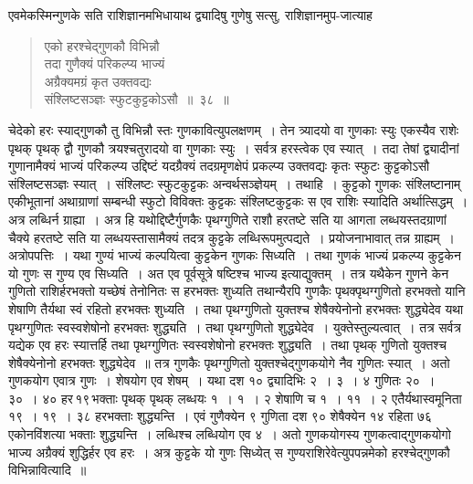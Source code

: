 \documentclass[11pt, openany]{book}
\begin{document}
\vspace{-3mm}
 एवमेकस्मिन्गुणके सति राशिज्ञानमभिधायाथ द्व्यादिषु गुणेषु सत्सु, 
राशिज्ञानमुप-जात्याह\textendash
\begin{quote}
    \bs
     एको हरश्चेद्गुणकौ विभिन्नौ \\

\vspace{-7mm}
\hspace{1cm} तदा गुणैक्यं परिकल्प्य भाज्यं \\

\vspace{-7mm}
 अग्रैक्यमग्रं कृत उक्तवद्यः \\

\vspace{-7mm}
\hspace{1cm} संश्लिष्टसञ्ज्ञः स्फुटकुट्टकोऽसौ~॥~३८~॥~
\end{quote}

 चेदेको हरः स्याद्गुणकौ तु विभिन्नौ स्तः गुणकावित्युपलक्षणम्~। तेन 
त्र्यादयो वा गुणकाः स्युः एकस्यैव राशेः पृथक् पृथक् द्वौ गुणकौ
त्रयश्चतुरादयो वा गुणकाः स्युः~। सर्वत्र हरस्त्वेक एव स्यात्~। तदा तेषां द्व्यादीनां
गुणानामैक्यं भाज्यं परिकल्प्य उद्दिष्टं यदग्रैक्यं तदग्रमृणक्षेपं प्रकल्प्य
उक्तवद्यः कृतः स्फुटः कुट्टकोऽसौ संश्लिष्टसञ्ज्ञः स्यात्~। संश्लिष्टः स्फुटकुट्टकः
अन्वर्थसञ्ज्ञेयम्~। तथाहि~। कुट्टको गुणकः संश्लिष्टानाम् एकीभूतानां अथाग्राणां सम्बन्धी स्फुटो विविक्तः कुट्टकः संश्लिष्टकुट्टकः स एव राशिः स्यादिति अर्थात्सिद्धम्~। अत्र लब्धिर्न ग्राह्या~। अत्र हि यथोद्दिष्टैर्गुणकैः पृथग्गुणिते राशौ हरतष्टे सति या आगता लब्धयस्तदग्राणां चैक्ये हरतष्टे सति या लब्धयस्तासामैक्यं तदत्र कुट्टके 
लब्धिरूपमुत्पद्यते~। प्रयोजनाभावात् तन्न ग्राह्यम्~।
\newpage%
 अत्रोपपत्तिः~। यथा गुण्यं भाज्यं कल्पयित्वा कुट्टकेन गुणकः 
सिध्यति~। तथा गुणकं भाज्यं प्रकल्प्य कुट्टकेन यो गुणः स गुण्य एव 
सिध्यति~। अत एव पूर्वसूत्रे षष्टिश्च भाज्य इत्याद्युक्तम्~। तत्र यथैकेन
गुणने केन गुणितो राशिर्हरभक्तो यच्छेषं तेनोनितः स हरभक्तः शुध्यति 
तथान्यैरपि गुणकैः पृथक्पृथग्गुणितो हरभक्तो यानि शेषाणि तैर्यथा स्वं रहितो 
हरभक्तः शुध्यति~। तथा पृथग्गुणितो युक्तश्च शेषैक्येनोनो हरभक्तः शुद्ध्येदेव 
यथा पृथग्गुणितः स्वस्वशेषोनो हरभक्तः शुद्ध्यति~। तथा पृथग्गुणितो 
शुद्ध्येदेव~। युक्तेस्तुल्यत्वात्~। तत्र सर्वत्र यद्येक एव हरः स्यात्तर्हि तथा 
पृथग्गुणितः स्वस्वशेषोनो हरभक्तः शुद्ध्यति~। तथा पृथक् गुणितो युक्तश्च
शेषैक्येनोनो हरभक्तः शुद्ध्येदेव~॥ तत्र गुणकैः पृथग्गुणितो युक्तश्चेद्गुणकयोगे 
नैव गुणितः स्यात्~। अतो गुणकयोग एवात्र गुणः~। शेषयोग एव शेषम्~। 
यथा दश १० द्व्यादिभिः २~। ३~। ४ गुणितः २०~। ३०~। ४० 
हर\textendash \,१९\textendash \,भक्ताः पृथक् पृथक् लब्धयः १~। १~। २ शेषाणि च १~। ११~। २ एतैर्यथास्वमूनिता १९~। १९~। ३८ हरभक्ताः शुद्ध्यन्ति~। एवं गुणैक्येन ९ गुणिता दश ९० शेषैक्येन १४ रहिता ७६ एकोनविंशत्या भक्ताः शुद्ध्यन्ति~। लब्धिश्च लब्धियोग एव ४~। अतो गुणकयोगस्य गुणकत्वाद्गुणकयोगो भाज्य अग्रैक्यं शुद्धिर्हर एव हरः~। अत्र कुट्टके यो गुणः सिध्येत् स गुण्यराशिरेवेत्युपपन्नमेको हरश्चेद्गुणकौ विभिन्नावित्यादि~॥~\\
\end{document}
